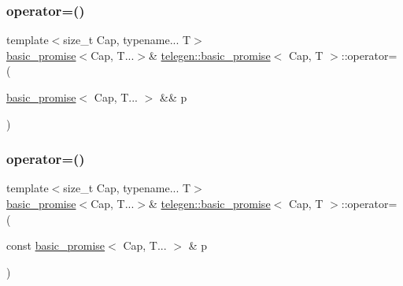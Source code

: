 \subsubsection{\texorpdfstring{operator=()}{operator=()}\hspace{0.1cm}{\footnotesize\ttfamily [1/2]}}
{\footnotesize\ttfamily template$<$size\+\_\+t Cap, typename... T$>$ \\
\hyperlink{classtelegen_1_1basic__promise}{basic\+\_\+promise}$<$Cap, T...$>$\& \hyperlink{classtelegen_1_1basic__promise}{telegen\+::basic\+\_\+promise}$<$ Cap, T $>$\+::operator= (\begin{DoxyParamCaption}\item[{\hyperlink{classtelegen_1_1basic__promise}{basic\+\_\+promise}$<$ Cap, T... $>$ \&\&}]{p }\end{DoxyParamCaption})\hspace{0.3cm}{\ttfamily [inline]}}

\mbox{\label{classtelegen_1_1basic__promise_acc3ccb6c4a41c043d4a39ee4c41c7c01}} 
\subsubsection{\texorpdfstring{operator=()}{operator=()}\hspace{0.1cm}{\footnotesize\ttfamily [2/2]}}
{\footnotesize\ttfamily template$<$size\+\_\+t Cap, typename... T$>$ \\
\hyperlink{classtelegen_1_1basic__promise}{basic\+\_\+promise}$<$Cap, T...$>$\& \hyperlink{classtelegen_1_1basic__promise}{telegen\+::basic\+\_\+promise}$<$ Cap, T $>$\+::operator= (\begin{DoxyParamCaption}\item[{const \hyperlink{classtelegen_1_1basic__promise}{basic\+\_\+promise}$<$ Cap, T... $>$ \&}]{p }\end{DoxyParamCaption})\hspace{0.3cm}{\ttfamily [delete]}}

\mbox{\label{classtelegen_1_1basic__promise_ad31610fb65ecc1c9f9b967c56d47e872}} 
